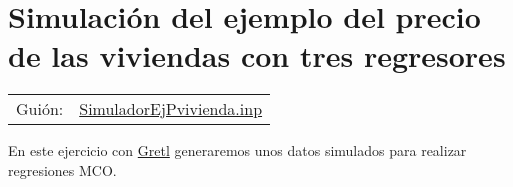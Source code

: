 \documentclass[11pt]{article}
\begin{document}
\section{Simulación del ejemplo del precio de las viviendas con tres regresores}
\label{sec:org431fd69}
\begin{center}
\begin{tabular}{ll}
Guión: & \href{https://github.com/mbujosab/Ectr/tree/master/Practicas/Gretl/scripts/SimuladorEjPvivienda.inp}{SimuladorEjPvivienda.inp}\\[0pt]
\end{tabular}
\end{center}

En este ejercicio con \href{https://gretl.sourceforge.net/es.html}{Gretl} generaremos unos datos simulados para realizar regresiones MCO.
\end{document}
